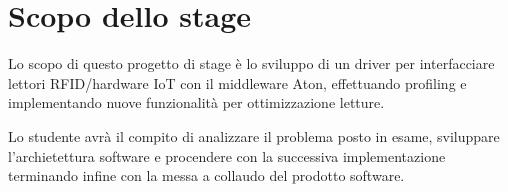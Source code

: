 \section*{Scopo dello stage}
Lo scopo di questo progetto di stage è lo sviluppo di un driver per interfacciare lettori RFID/hardware IoT con il middleware Aton, 
effettuando profiling e implementando nuove funzionalità per ottimizzazione letture.

Lo studente avrà il compito di analizzare il problema posto in esame, 
sviluppare l'archietettura software e procendere con la successiva implementazione 
terminando infine con la messa a collaudo del prodotto software.
